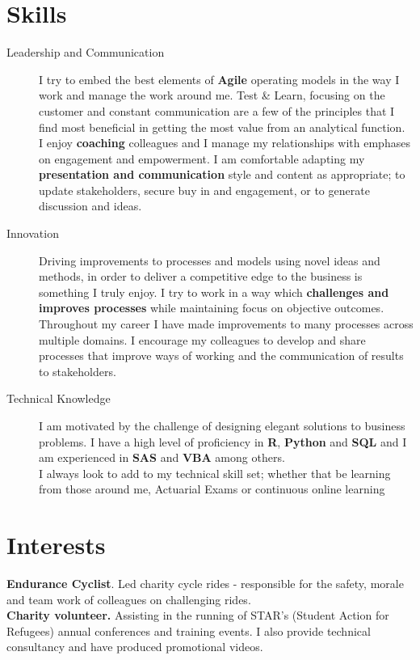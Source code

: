 \documentclass[11pt]{article}
\begin{document}
\section*{Skills}
\begin{description}
\item[Leadership and Communication] I try to embed the best elements of \textbf{Agile} operating models in the way I work and manage the work around me.  Test \& Learn, focusing on the customer and constant communication are a few of the principles that I find most beneficial in getting the most value from an analytical function.\\
I enjoy \textbf{coaching} colleagues and I manage my relationships with emphases on engagement and empowerment.
I am comfortable adapting my \textbf{presentation and communication} style and content as appropriate; to update stakeholders, secure buy in and engagement, or to generate discussion and ideas. 
\item[Innovation] Driving improvements to processes and models using novel ideas and methods, in order to deliver a competitive edge to the business is something I truly enjoy. 
I try to work in a way which \textbf{challenges and improves processes} while maintaining focus on objective outcomes.\\
Throughout my career I have made improvements to many processes across multiple domains. I encourage my colleagues to develop and share processes that improve ways of working and the communication of results to stakeholders.
\item[Technical Knowledge] I am motivated by the challenge of designing elegant solutions to business problems.
I have a high level of proficiency in \textbf{R}, \textbf{Python} and \textbf{SQL} and I am experienced in \textbf{SAS} and \textbf{VBA} among others.\\
I always look to add to my technical skill set; whether that be learning from those around me, Actuarial Exams or continuous online learning

\end{description} 

\section*{Interests}

\textbf{Endurance Cyclist}. Led charity cycle rides - responsible for the safety, morale and team work of colleagues on challenging rides.\\
\noindent \textbf{Charity volunteer.} Assisting in the running of STAR's (Student Action for Refugees) annual conferences and training events.
I also provide technical consultancy and have produced promotional videos.

\end{document}

